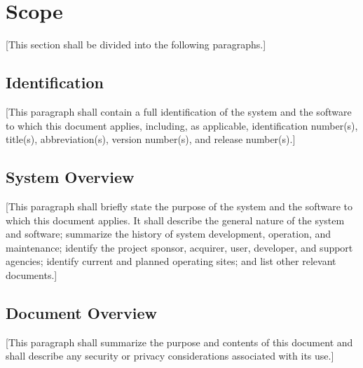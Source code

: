\chapter{Scope\label{ref-001}}

[This section shall be divided into the following paragraphs.]

\section{Identification\label{ref-002}}

[This paragraph shall contain a full identification of the system and the software to which this document applies, including, as applicable, identification number(s), title(s), abbreviation(s), version number(s), and release number(s).]

\section{System Overview\label{ref-003}}

[This paragraph shall briefly state the purpose of the system and the software to which this document applies. It shall describe the general nature of the system and software; summarize the history of system development, operation, and maintenance; identify the project sponsor, acquirer, user, developer, and support agencies; identify current and planned operating sites; and list other relevant documents.]

\section{Document Overview\label{ref-004}}

[This paragraph shall summarize the purpose and contents of this document and shall describe any security or privacy considerations associated with its use.]